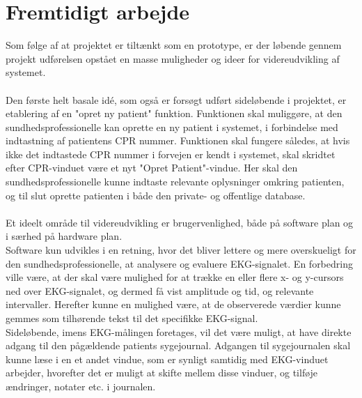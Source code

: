 \section{Fremtidigt arbejde}
Som følge af at projektet er tiltænkt som en prototype, er der løbende gennem projekt udførelsen opstået en masse muligheder og ideer for videreudvikling af systemet. \\\\
Den første helt basale idé, som også er forsøgt udført sideløbende i projektet, er etablering af en "opret ny patient" funktion. Funktionen skal muliggøre, at den sundhedsprofessionelle kan oprette en ny patient i systemet, i forbindelse med indtastning af patientens CPR nummer. Funktionen skal fungere således, at hvis ikke det indtastede CPR nummer i forvejen er kendt i systemet, skal skridtet efter CPR-vinduet være et nyt "Opret Patient"-vindue. Her skal den sundhedsprofessionelle kunne indtaste relevante oplysninger omkring patienten, og til slut oprette patienten i både den private- og offentlige database.\\\\
Et ideelt område til videreudvikling er brugervenlighed, både på software plan og i særhed på hardware plan.\\
Software kun udvikles i en retning, hvor det bliver lettere og mere overskueligt for den sundhedsprofessionelle, at analysere og evaluere EKG-signalet. En forbedring ville være, at der skal være mulighed for at trække en eller flere x- og y-cursors ned over EKG-signalet, og dermed få vist amplitude og tid, og relevante intervaller. Herefter kunne en mulighed være, at de observerede værdier kunne gemmes som tilhørende tekst til det specifikke EKG-signal. \\
Sideløbende, imens EKG-målingen foretages, vil det være muligt, at have direkte adgang til den pågældende patients sygejournal. Adgangen til sygejournalen skal kunne læse i en et andet vindue, som er synligt samtidig med EKG-vinduet arbejder, hvorefter det er muligt at skifte mellem disse vinduer, og tilføje ændringer, notater etc. i journalen.
